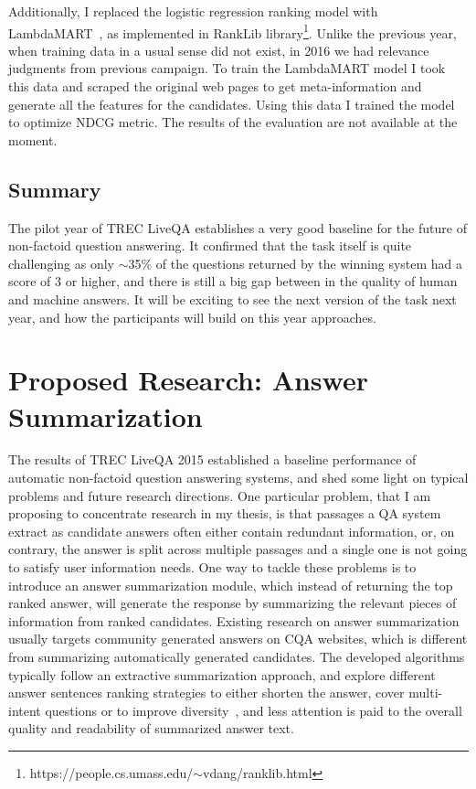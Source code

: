 Additionally, I replaced the logistic regression ranking model with LambdaMART~\cite{burges2010ranknet}, as implemented in RankLib library\footnote{https://people.cs.umass.edu/$\sim$vdang/ranklib.html}.
Unlike the previous year, when training data in a usual sense did not exist, in 2016 we had relevance judgments from previous campaign.
To train the LambdaMART model I took this data and scraped the original web pages to get meta-information and generate all the features for the candidates.
Using this data I trained the model to optimize NDCG metric.
The results of the evaluation are not available at the moment.

\subsection{Summary}
\label{section:non-factoid:liveqa:summary}

The pilot year of TREC LiveQA establishes a very good baseline for the future of non-factoid question answering.
It confirmed that the task itself is quite challenging as only $\sim$35\% of the questions returned by the winning system had a score of 3 or higher, and there is still a big gap between in the quality of human and machine answers.
It will be exciting to see the next version of the task next year, and how the participants will build on this year approaches.



\section{Proposed Research: Answer Summarization}
\label{section:non-factoid:proposal}

The results of TREC LiveQA 2015 established a baseline performance of automatic non-factoid question answering systems, and shed some light on typical problems and future research directions.
One particular problem, that I am proposing to concentrate research in my thesis, is that passages a QA system extract as candidate answers often either contain redundant information, or, on contrary, the answer is split across multiple passages and a single one is not going to satisfy user information needs.
One way to tackle these problems is to introduce an answer summarization module, which instead of returning the top ranked answer, will generate the response by summarizing the relevant pieces of information from ranked candidates.
Existing research on answer summarization usually targets community generated answers on CQA websites, which is different from summarizing automatically generated candidates.
The developed algorithms typically follow an extractive summarization approach, and explore different answer sentences ranking strategies to either shorten the answer, cover multi-intent questions or to improve diversity~\cite{chan2012community,zhaochun_sparsecoding_2016}, and less attention is paid to the overall quality and readability of summarized answer text.


